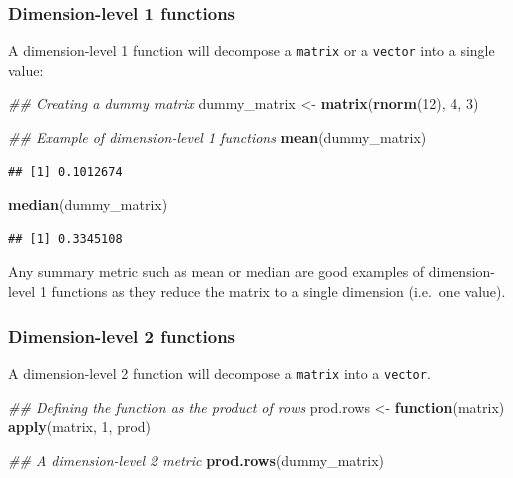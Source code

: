\documentclass[
]{book}
\newenvironment{Shaded}{\begin{snugshade}}{\end{snugshade}}
\newcommand{\CommentTok}[1]{\textcolor[rgb]{0.56,0.35,0.01}{\textit{#1}}}
\newcommand{\ControlFlowTok}[1]{\textcolor[rgb]{0.13,0.29,0.53}{\textbf{#1}}}
\newcommand{\DecValTok}[1]{\textcolor[rgb]{0.00,0.00,0.81}{#1}}
\newcommand{\KeywordTok}[1]{\textcolor[rgb]{0.13,0.29,0.53}{\textbf{#1}}}
\newcommand{\NormalTok}[1]{#1}
\newcommand{\StringTok}[1]{\textcolor[rgb]{0.31,0.60,0.02}{#1}}
\begin{document}
\hypertarget{dimension-level-1-functions}{%
\subsubsection{Dimension-level 1 functions}\label{dimension-level-1-functions}}

A dimension-level 1 function will decompose a \texttt{matrix} or a \texttt{vector} into a single value:

\begin{Shaded}
\begin{Highlighting}[]
\CommentTok{\#\# Creating a dummy matrix}
\NormalTok{dummy\_matrix \textless{}{-}}\StringTok{ }\KeywordTok{matrix}\NormalTok{(}\KeywordTok{rnorm}\NormalTok{(}\DecValTok{12}\NormalTok{), }\DecValTok{4}\NormalTok{, }\DecValTok{3}\NormalTok{)}

\CommentTok{\#\# Example of dimension{-}level 1 functions}
\KeywordTok{mean}\NormalTok{(dummy\_matrix)}
\end{Highlighting}
\end{Shaded}

\begin{verbatim}
## [1] 0.1012674
\end{verbatim}

\begin{Shaded}
\begin{Highlighting}[]
\KeywordTok{median}\NormalTok{(dummy\_matrix)}
\end{Highlighting}
\end{Shaded}

\begin{verbatim}
## [1] 0.3345108
\end{verbatim}

Any summary metric such as mean or median are good examples of dimension-level 1 functions as they reduce the matrix to a single dimension (i.e.~one value).

\hypertarget{dimension-level-2-functions}{%
\subsubsection{Dimension-level 2 functions}\label{dimension-level-2-functions}}

A dimension-level 2 function will decompose a \texttt{matrix} into a \texttt{vector}.

\begin{Shaded}
\begin{Highlighting}[]
\CommentTok{\#\# Defining the function as the product of rows}
\NormalTok{prod.rows \textless{}{-}}\StringTok{ }\ControlFlowTok{function}\NormalTok{(matrix) }\KeywordTok{apply}\NormalTok{(matrix, }\DecValTok{1}\NormalTok{, prod)}

\CommentTok{\#\# A dimension{-}level 2 metric}
\KeywordTok{prod.rows}\NormalTok{(dummy\_matrix)}
\end{Highlighting}
\end{Shaded}
\end{document}

